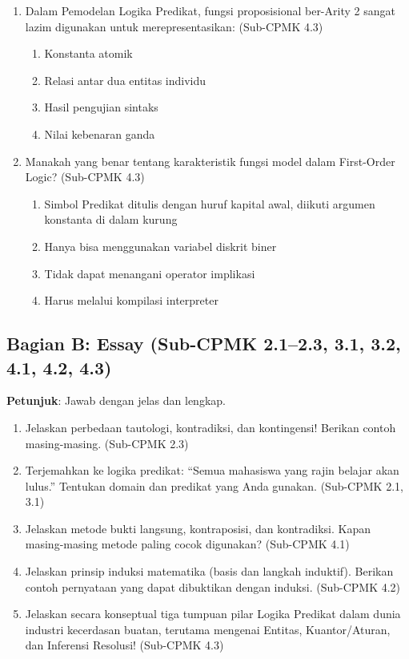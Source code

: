 \begin{enumerate}
  \item Dalam Pemodelan Logika Predikat, fungsi proposisional ber-Arity 2 sangat lazim digunakan untuk merepresentasikan: (Sub-CPMK 4.3)
  \begin{enumerate}
    \item Konstanta atomik
    \item Relasi antar dua entitas individu
    \item Hasil pengujian sintaks
    \item Nilai kebenaran ganda
  \end{enumerate}
  
  \item Manakah yang benar tentang karakteristik fungsi model dalam First-Order Logic? (Sub-CPMK 4.3)
  \begin{enumerate}
    \item Simbol Predikat ditulis dengan huruf kapital awal, diikuti argumen konstanta di dalam kurung
    \item Hanya bisa menggunakan variabel diskrit biner
    \item Tidak dapat menangani operator implikasi
    \item Harus melalui kompilasi interpreter
  \end{enumerate}
\end{enumerate}

\subsection{Bagian B: Essay (Sub-CPMK 2.1--2.3, 3.1, 3.2, 4.1, 4.2, 4.3)}

\textbf{Petunjuk}: Jawab dengan jelas dan lengkap.

\begin{enumerate}
  \item Jelaskan perbedaan tautologi, kontradiksi, dan kontingensi! Berikan contoh masing-masing. (Sub-CPMK 2.3)
  \item Terjemahkan ke logika predikat: ``Semua mahasiswa yang rajin belajar akan lulus.'' Tentukan domain dan predikat yang Anda gunakan. (Sub-CPMK 2.1, 3.1)
  \item Jelaskan metode bukti langsung, kontraposisi, dan kontradiksi. Kapan masing-masing metode paling cocok digunakan? (Sub-CPMK 4.1)
  \item Jelaskan prinsip induksi matematika (basis dan langkah induktif). Berikan contoh pernyataan yang dapat dibuktikan dengan induksi. (Sub-CPMK 4.2)
  \item Jelaskan secara konseptual tiga tumpuan pilar Logika Predikat dalam dunia industri kecerdasan buatan, terutama mengenai Entitas, Kuantor/Aturan, dan Inferensi Resolusi! (Sub-CPMK 4.3)
\end{enumerate}

